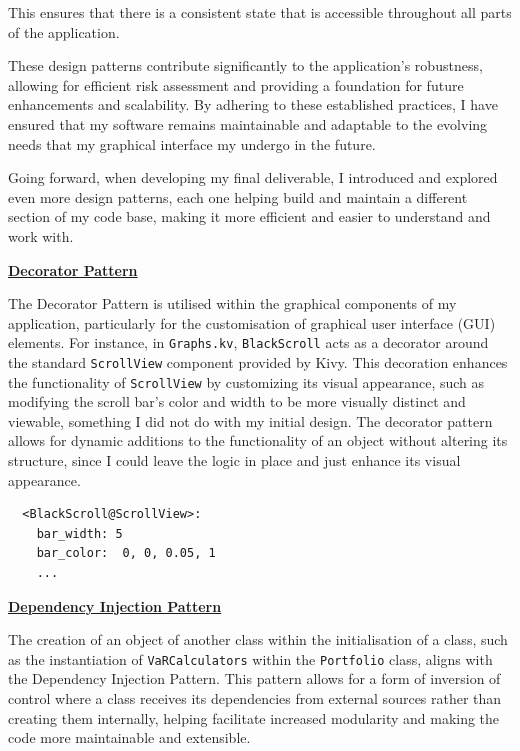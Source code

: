 \documentclass{article}
\begin{document}
This ensures that there is a consistent state that is accessible throughout all parts of the application.\\\vspace{0.3cm}

These design patterns contribute significantly to the application's robustness, allowing for efficient risk assessment and providing a foundation for future enhancements and scalability. By adhering to these established practices, I have ensured that my software remains maintainable and adaptable to the evolving needs that my graphical interface my undergo in the future.\\\vspace{0.3cm}

Going forward, when developing my final deliverable, I introduced and explored even more design patterns, each one helping build and maintain a different section of my code base, making it more efficient and easier to understand and work with.\\\vspace{0.3cm}

\underline{\textbf{Decorator Pattern}}\\\vspace{0.3cm}

The Decorator Pattern is utilised within the graphical components of my application, particularly for the customisation of graphical user interface (GUI) elements. For instance, in \texttt{Graphs.kv}, \texttt{BlackScroll} acts as a decorator around the standard \texttt{ScrollView} component provided by Kivy. This decoration enhances the functionality of \texttt{ScrollView} by customizing its visual appearance, such as modifying the scroll bar's color and width to be more visually distinct and viewable, something I did not do with my initial design. The decorator pattern allows for dynamic additions to the functionality of an object without altering its structure, since I could leave the logic in place and just enhance its visual appearance.

\begin{verbatim}
  <BlackScroll@ScrollView>:
    bar_width: 5
    bar_color:  0, 0, 0.05, 1
    ...
\end{verbatim}

\vspace{0.3cm}
\underline{\textbf{Dependency Injection Pattern}}\\\vspace{0.3cm}

The creation of an object of another class within the initialisation of a class, such as the instantiation of \texttt{VaRCalculators} within the \texttt{Portfolio} class, aligns with the Dependency Injection Pattern. This pattern allows for a form of inversion of control where a class receives its dependencies from external sources rather than creating them internally, helping facilitate increased modularity and making the code more maintainable and extensible.
\end{document}
